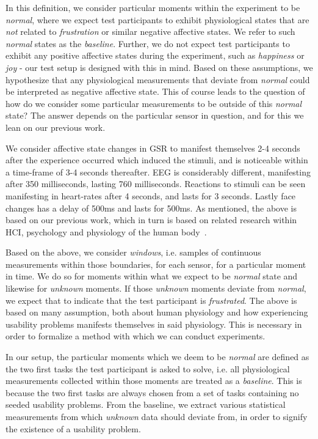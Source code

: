 In this definition, we consider particular moments within the experiment to be \textit{normal}, where we expect test
participants to exhibit physiological states that are \textit{not} related to \textit{frustration} or similar negative
affective states. We refer to such \textit{normal} states as the \textit{baseline}. Further, we do not expect test
participants to exhibit any positive affective states during the experiment, such as \textit{happiness} or \textit{joy}
- our test setup is designed with this in mind. Based on these assumptions, we hypothesize that any physiological
measurements that deviate from \textit{normal} could be interpreted as negative affective state. This of course leads to
the question of how do we consider some particular measurements to be outside of this \textit{normal} state? The answer
depends on the particular sensor in question, and for this we lean on our previous work.

We consider affective state changes in GSR to manifest themselves 2-4 seconds after the experience occurred which
induced the stimuli, and is noticeable within a time-frame of 3-4 seconds thereafter. EEG is considerably different,
manifesting after 350 milliseconds, lasting 760 milliseconds. Reactions to stimuli can be seen manifesting in heart-rates
after 4 seconds, and lasts for 3 seconds. Lastly face changes has a delay of 500ms and lasts for 500ms. As mentioned,
the above is based on our previous work, which in turn is based on related research within HCI, psychology and
physiology of the human body~\cite{9th_semester_project}.

Based on the above, we consider \textit{windows}, i.e. samples of continuous measurements within those boundaries, for
each sensor, for a particular moment in time. We do so for moments within what we expect to be \textit{normal} state and
likewise for \textit{unknown} moments. If those \textit{unknown} moments deviate from \textit{normal}, we expect that to
indicate that the test participant is \textit{frustrated}. The above is based on many assumption, both about human
physiology and how experiencing usability problems manifests themselves in said physiology. This is necessary in order
to formalize a method with which we can conduct experiments.

In our setup, the particular moments which we deem to be \textit{normal} are defined as the two first tasks the test
participant is asked to solve, i.e. all physiological measurements collected within those moments are treated as a
\textit{baseline}. This is because the two first tasks are always chosen from a set of tasks containing no seeded
usability problems. From the baseline, we extract various statistical measurements from which \textit{unknown} data
should deviate from, in order to signify the existence of a usability problem.

